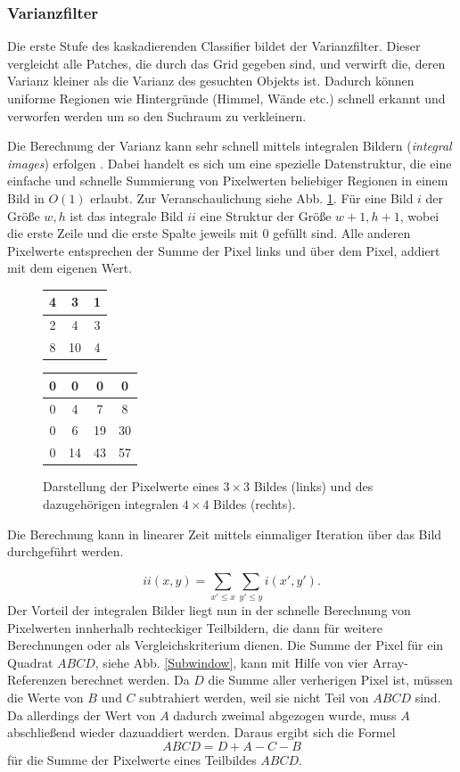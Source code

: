 	\subsubsection{Varianzfilter}
	Die erste Stufe des kaskadierenden Classifier bildet der Varianzfilter. Dieser vergleicht alle Patches, die durch das Grid gegeben sind, und verwirft die, deren Varianz kleiner als die Varianz des gesuchten Objekts ist. Dadurch können uniforme Regionen wie Hintergründe (Himmel, Wände etc.) schnell erkannt und verworfen werden um so den Suchraum zu verkleinern.

	Die Berechnung der Varianz kann sehr schnell mittels integralen Bildern (\textit{integral images}) erfolgen \cite{key-6}. Dabei handelt es sich um eine spezielle Datenstruktur, die eine einfache und schnelle Summierung von Pixelwerten beliebiger Regionen in einem Bild in $O(1)$ erlaubt. Zur Veranschaulichung siehe Abb. \ref{integralImg}. Für eine Bild $i$ der Größe $w,h$ ist das integrale Bild $ii$ eine Struktur der Größe $w+1,h+1$, wobei die erste Zeile und die erste Spalte jeweils mit $0$ gefüllt sind. Alle anderen Pixelwerte entsprechen der Summe der Pixel links und über dem Pixel, addiert mit dem eigenen Wert.

	\begin{figure}[h]
	\centering{}%
	\begin{tabular}{|c|c|c|}
	\hline
	4 & 3 & 1
	\tabularnewline
	\hline
	\hline
	2 & 4 & 3
	\tabularnewline
	\hline
	8 & 10 & 4
	\tabularnewline
	\hline
	\end{tabular} %
	\begin{tabular}{|c|c|c|c|}
	\hline
	0 & 0 & 0 & 0
	\tabularnewline
	\hline
	\hline
	0 & 4 & 7 & 8\tabularnewline
	\hline
	0 & 6 & 19 & 30
	\tabularnewline
	\hline
	0 & 14 & 43 & 57
	\tabularnewline
	\hline
	\end{tabular}\caption{Darstellung der Pixelwerte eines $3\times3$ Bildes (links) und des
	dazugehörigen integralen $4\times4$ Bildes (rechts).}
	\label{integralImg}
	\end{figure}

	Die Berechnung kann in linearer Zeit mittels einmaliger Iteration über das Bild durchgeführt werden.

	$$ ii(x,y)=\underset{x'\leq x}{\sum}\underset{y'\leq y}{\sum}i(x',y'). $$
	Der Vorteil der integralen Bilder liegt nun in der schnelle Berechnung von Pixelwerten innherhalb rechteckiger Teilbildern, die dann für weitere Berechnungen oder als Vergleichskriterium dienen. Die Summe der Pixel für ein Quadrat $ABCD$, siehe Abb. \ref{Subwindow}, kann mit Hilfe von vier Array-Referenzen berechnet werden. Da $D$ die Summe aller verherigen Pixel ist, müssen die Werte von $B$ und $C$ subtrahiert werden, weil sie nicht Teil von $ABCD$ sind. Da allerdings der Wert von $A$ dadurch zweimal abgezogen wurde, muss $A$ abschließend wieder dazuaddiert werden. Daraus ergibt sich die Formel $$ABCD=D+A-C-B$$ für die Summe der Pixelwerte eines Teilbildes $ABCD$.

